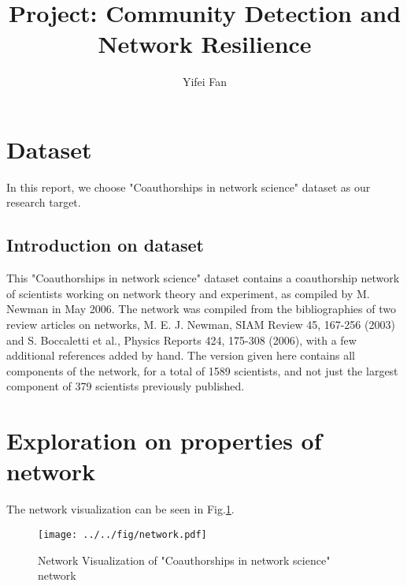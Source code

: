 \documentclass[runningheads]{llncs}
\begin{document}
%
\title{Project: Community Detection and Network Resilience}
%
%
\author{Yifei Fan}
%
%
%
\maketitle              %

\section{Dataset}
In this report, we choose "Coauthorships in network science" dataset\cite{ref:dataset} as our research target.

\subsection{Introduction on dataset}

This "Coauthorships in network science" dataset contains a coauthorship network of scientists
working on network theory and experiment, as compiled by M. Newman in May
2006.  The network was compiled from the bibliographies of two review
articles on networks, M. E. J. Newman, SIAM Review 45, 167-256 (2003) and
S. Boccaletti et al., Physics Reports 424, 175-308 (2006), with a few
additional references added by hand.  The version given here contains all
components of the network, for a total of 1589 scientists, and not just the
largest component of 379 scientists previously published\cite{ref:dataset}.

\section{Exploration on properties of network}

The network visualization can be seen in Fig.\ref{fig:vis}.

\begin{figure}
    \centering
    \texttt{[image: ../../fig/network.pdf]}
    \caption{Network Visualization of "Coauthorships in network science" network} 
    \label{fig:vis}
\end{figure}
\end{document}
